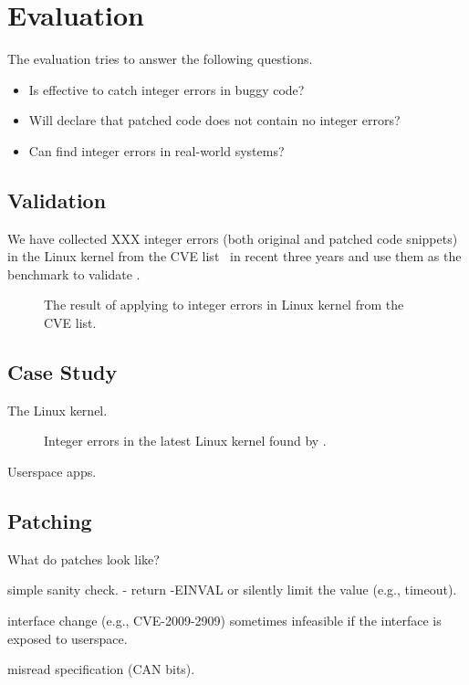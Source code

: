 \section{Evaluation}
\label{s:eval}

The evaluation tries to answer the following questions.
\begin{itemize}
\item
Is \sys effective to catch integer errors in buggy code?
\item
Will \sys declare that patched code does not contain no integer errors?
\item
Can \sys find integer errors in real-world systems?
\end{itemize}

\subsection{Validation}

We have collected XXX integer errors (both original and patched
code snippets) in the Linux kernel from the CVE list~\cite{cve} in
recent three years and use them as the benchmark to validate \sys.

\newcommand{\ok}{\textcolor{JungleGreen}{\checkmark}\xspace}
\newcommand{\checked}{$\boxtimes$}
\begin{figure*}
\centering
\footnotesize

\caption{The result of applying \sys to integer errors in Linux
kernel from the CVE list.}
\end{figure*}

\subsection{Case Study}

The Linux kernel.

\begin{figure*}
\centering
\footnotesize

\caption{Integer errors in the latest Linux kernel found by \sys.}
\end{figure*}

Userspace apps.

\subsection{Patching}

What do patches look like?

simple sanity check.
- return -EINVAL or silently limit the value (e.g., timeout).

interface change (e.g., CVE-2009-2909)
sometimes infeasible if the interface is exposed to userspace.

misread specification (CAN bits).
